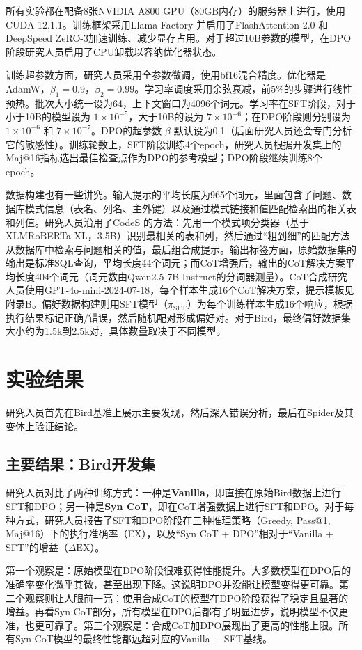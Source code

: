 所有实验都在配备8张NVIDIA A800 GPU（80GB内存）的服务器上进行，使用CUDA 12.1.1。训练框架采用Llama Factory 并启用了FlashAttention 2.0  和 DeepSpeed ZeRO-3加速训练、减少显存占用。对于超过10B参数的模型，在DPO阶段研究人员启用了CPU卸载以容纳优化器状态。

训练超参数方面，研究人员采用全参数微调，使用bf16混合精度。优化器是AdamW，\(\beta_1=0.9\)，\(\beta_2=0.99\)。学习率调度采用余弦衰减，前5\%的步骤进行线性预热。批次大小统一设为64，上下文窗口为4096个词元。学习率在SFT阶段，对于小于10B的模型设为 \(1\times10^{-5}\)，大于10B的设为 \(7\times10^{-6}\)；在DPO阶段则分别设为 \(1\times10^{-6}\) 和 \(7\times10^{-7}\)。DPO的超参数 \(\beta\) 默认设为0.1（后面研究人员还会专门分析它的敏感性）。训练轮数上，SFT阶段训练4个epoch，研究人员根据开发集上的Maj@16指标选出最佳检查点作为DPO的参考模型；DPO阶段继续训练8个epoch。

数据构建也有一些讲究。输入提示的平均长度为965个词元，里面包含了问题、数据库模式信息（表名、列名、主外键）以及通过模式链接和值匹配检索出的相关表和列值。研究人员沿用了CodeS 的方法：先用一个模式项分类器（基于XLMRoBERTa-XL，3.5B）识别最相关的表和列，然后通过“粗到细”的匹配方法从数据库中检索与问题相关的值，最后组合成提示。输出标签方面，原始数据集的输出是标准SQL查询，平均长度44个词元；而CoT增强后，输出的CoT解决方案平均长度404个词元（词元数由Qwen2.5-7B-Instruct的分词器测量）。CoT合成研究人员使用GPT-4o-mini-2024-07-18，每个样本生成16个CoT解决方案，提示模板见附录B。偏好数据构建则用SFT模型（\(\pi_{\mathrm{SFT}}\)）为每个训练样本生成16个响应，根据执行结果标记正确/错误，然后随机配对形成偏好对。对于Bird，最终偏好数据集大小约为1.5k到2.5k对，具体数量取决于不同模型。

\section{实验结果}
研究人员首先在Bird基准上展示主要发现，然后深入错误分析，最后在Spider及其变体上验证结论。

\subsection{主要结果：Bird开发集}
研究人员对比了两种训练方式：一种是\textbf{Vanilla}，即直接在原始Bird数据上进行SFT和DPO；另一种是\textbf{Syn CoT}，即在CoT增强数据上进行SFT和DPO。对于每种方式，研究人员报告了SFT和DPO阶段在三种推理策略（Greedy, Pass@1, Maj@16）下的执行准确率（EX），以及“Syn CoT + DPO”相对于“Vanilla + SFT”的增益（\(\Delta \mathrm{EX}\)）。

第一个观察是：原始模型在DPO阶段很难获得性能提升。大多数模型在DPO后的准确率变化微乎其微，甚至出现下降。这说明DPO并没能让模型变得更可靠。第二个观察则让人眼前一亮：使用合成CoT的模型在DPO阶段获得了稳定且显著的增益。再看Syn CoT部分，所有模型在DPO后都有了明显进步，说明模型不仅更准，也更可靠了。第三个观察是：合成CoT加DPO展现出了更高的性能上限。所有Syn CoT模型的最终性能都远超对应的Vanilla + SFT基线。

